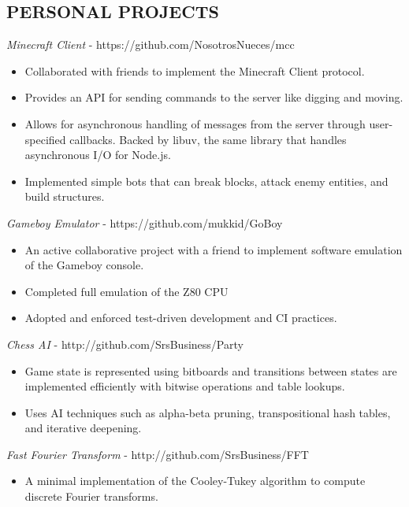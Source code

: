 \documentclass[overlapped, 10pt]{res} %
\begin{document}
\begin{resume}

\section{PERSONAL PROJECTS}
{\sl Minecraft Client} - https://github.com/NosotrosNueces/mcc
\begin{itemize} \itemsep -2pt %
    \item Collaborated with friends to implement the Minecraft Client protocol.
    \item Provides an API for sending commands to the server like digging and moving.
    \item Allows for asynchronous handling of messages from the server through user-specified callbacks. Backed by libuv, the same library that handles asynchronous I/O for Node.js.
    \item Implemented simple bots that can break blocks, attack enemy entities, and build structures.
\end{itemize}
{\sl Gameboy Emulator} - https://github.com/mukkid/GoBoy
\begin{itemize} \itemsep -2pt %
    \item An active collaborative project with a friend to implement software emulation of the Gameboy console.
    \item Completed full emulation of the Z80 CPU
    \item Adopted and enforced test-driven development and CI practices.
\end{itemize}
{\sl Chess AI} - http://github.com/SrsBusiness/Party
\begin{itemize} \itemsep -2pt %
    \item Game state is represented using bitboards and transitions between states are implemented efficiently with bitwise operations and table lookups.
    \item Uses AI techniques such as alpha-beta pruning, transpositional hash tables, and iterative deepening.
\end{itemize}
{\sl Fast Fourier Transform} - http://github.com/SrsBusiness/FFT
\begin{itemize} \itemsep -2pt %
    \item A minimal implementation of the Cooley-Tukey algorithm to compute discrete Fourier transforms.
\end{itemize}

\end{resume}
\end{document}
